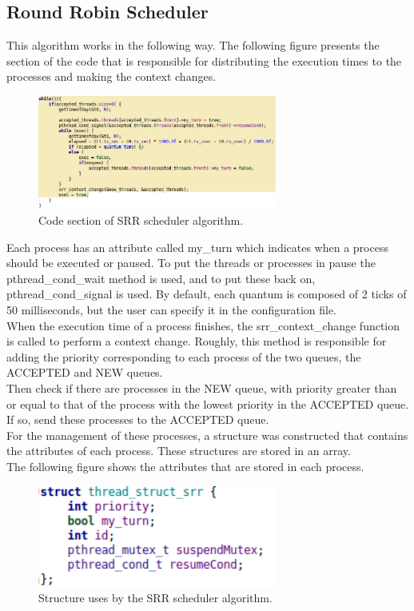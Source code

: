 \documentclass{article}
\begin{document}
\subsection{Round Robin Scheduler}
This algorithm works in the following way.
The following figure presents the section of the code that is responsible for distributing the execution times to the processes and making the context changes. 
\begin{figure}[H]
	\centering
	\captionsetup{justification=centering, margin=1cm}
    \includegraphics[width = 0.7\textwidth]{SRR.png}
    \caption{Code section of SRR scheduler algorithm.}
	\label{fig:SRR}
\end{figure}
Each process has an attribute called my\_turn which indicates when a process should be executed or paused. To put the threads or processes in pause the pthread\_cond\_wait method is used, and to put these back on, pthread\_cond\_signal is used.
By default, each quantum is composed of 2 ticks of 50 milliseconds, but the user can specify it in the configuration file.\\
When the execution time of a process finishes, the srr\_context\_change function is called to perform a context change.
Roughly, this method is responsible for adding the priority corresponding to each process of the two queues, the ACCEPTED and NEW queues. \\
Then check if there are processes in the NEW queue, with priority greater than or equal to that of the process with the lowest priority in the ACCEPTED queue. If so, send these processes to the ACCEPTED queue. \\
For the management of these processes, a structure was constructed that contains the attributes of each process. These structures are stored in an array.\\
The following figure shows the attributes that are stored in each process.
\begin{figure}[H]
	\centering
	\captionsetup{justification=centering, margin=1cm}
    \includegraphics[width = 0.7\textwidth]{structSRR.png}
    \caption{Structure uses by the SRR scheduler algorithm.}
	\label{fig:structSRR}
\end{figure}
\end{document}
